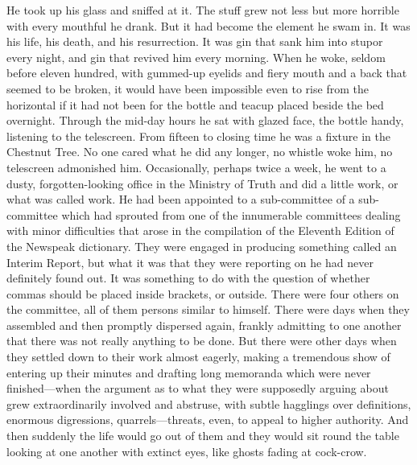 \begin{paracol}{2}
He took up his glass and sniffed at it. The stuff grew not less but more
horrible with every mouthful he drank. But it had become the element he
swam in. It was his life, his death, and his resurrection. It was gin
that sank him into stupor every night, and gin that revived him every
morning. When he woke, seldom before eleven hundred, with gummed-up
eyelids and fiery mouth and a back that seemed to be broken, it would
have been impossible even to rise from the horizontal if it had not been
for the bottle and teacup placed beside the bed overnight. Through the
mid-day hours he sat with glazed face, the bottle handy, listening to
the telescreen. From fifteen to closing time he was a fixture in the
Chestnut Tree. No one cared what he did any longer, no whistle woke him,
no telescreen admonished him. Occasionally, perhaps twice a week, he
went to a dusty, forgotten-looking office in the Ministry of Truth and
did a little work, or what was called work. He had been appointed to a
sub-committee of a sub-committee which had sprouted from one of the
innumerable committees dealing with minor difficulties that arose in the
compilation of the Eleventh Edition of the Newspeak dictionary. They
were engaged in producing something called an Interim Report, but what
it was that they were reporting on he had never definitely found out. It
was something to do with the question of whether commas should be placed
inside brackets, or outside. There were four others on the committee,
all of them persons similar to himself. There were days when they
assembled and then promptly dispersed again, frankly admitting to one
another that there was not really anything to be done. But there were
other days when they settled down to their work almost eagerly, making a
tremendous show of entering up their minutes and drafting long memoranda
which were never finished---when the argument as to what they were
supposedly arguing about grew extraordinarily involved and abstruse,
with subtle hagglings over definitions, enormous digressions,
quarrels---threats, even, to appeal to higher authority. And then
suddenly the life would go out of them and they would sit round the
table looking at one another with extinct eyes, like ghosts fading at
cock-crow.

\switchcolumn


\end{paracol}
